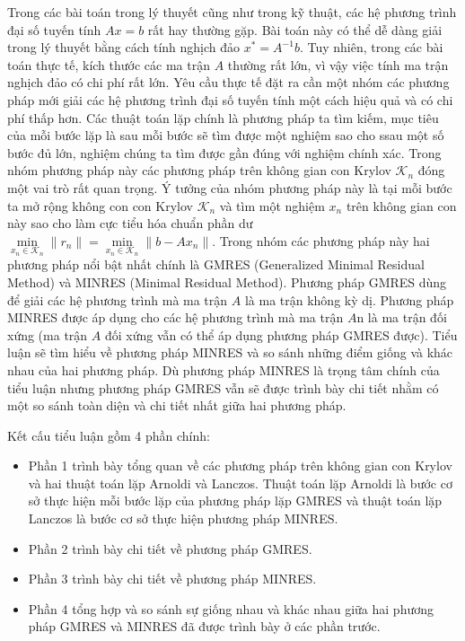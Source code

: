 \documentclass[14pt, a4paper]{article}
\numberwithin{equation}{section}
\numberwithin{algorithm}{section}
\numberwithin{figure}{section}
\numberwithin{dl}{section}
\numberwithin{md}{section}
\numberwithin{bd}{section}
\numberwithin{dn}{section}
\begin{document}
Trong các bài toán trong lý thuyết cũng như trong kỹ thuật, các hệ phương trình đại số tuyến tính $Ax=b$ rất hay thường gặp. Bài toán này có thể dễ dàng giải trong lý thuyết bằng cách tính nghịch đảo $x^* = A^{-1}b$. Tuy nhiên, trong các bài toán thực tế, kích thước các ma trận $A$ thường rất lớn, vì vậy việc tính ma trận nghịch đảo có chi phí rất lớn. Yêu cầu thực tế đặt ra cần một nhóm các phương pháp mới giải các hệ phương trình đại số tuyến tính một cách hiệu quả và có chi phí thấp hơn.
Các thuật toán lặp chính là phương pháp ta tìm kiếm, mục tiêu của mỗi bước lặp là sau mỗi bước sẽ tìm được một nghiệm sao cho ssau một số bước đủ lớn, nghiệm chúng ta tìm được gần đúng với nghiệm chính xác. Trong nhóm phương pháp này các phương pháp trên không gian con Krylov $\mathcal{K}_n$ đóng một vai trò rất quan trọng. Ý tưởng của nhóm phương pháp này là tại mỗi bước ta mở rộng không con con Krylov $\mathcal{K}_n$ và tìm một nghiệm $x_n$ trên không gian con này sao cho làm cực tiểu hóa chuẩn phần dư $\underset{x_n \in \mathcal{K}_n}{\min}\lVert r_n \rVert = \underset{x_n \in \mathcal{K}_n}{\min}\lVert b - A x_n \rVert$. Trong nhóm các phương pháp này hai phương pháp nổi bật nhất chính là GMRES (Generalized Minimal Residual Method) và MINRES (Minimal Residual Method).
Phương pháp GMRES dùng để giải các hệ phương trình mà ma trận $A$ là ma trận không kỳ dị. Phương pháp MINRES được áp dụng cho các hệ phương trình mà ma trận $A$n là ma trận đối xứng (ma trận $A$ đối xứng vẫn có thể áp dụng phương pháp GMRES được). Tiểu luận sẽ tìm hiểu về phương pháp MINRES và so sánh những điểm giống và khác nhau của hai phương pháp. Dù phương pháp MINRES là trọng tâm chính của tiểu luận nhưng phương pháp GMRES vẫn sẽ được trình bày chi tiết nhằm có một so sánh toàn diện và chi tiết nhất giữa hai phương pháp.

Kết cấu tiểu luận gồm 4 phần chính:

\begin{itemize}
    \item Phần 1 trình bày tổng quan về các phương pháp trên không gian con Krylov và hai thuật toán lặp Arnoldi và Lanczos. Thuật toán lặp Arnoldi là bước cơ sở thực hiện mỗi bước lặp của phương pháp lặp GMRES và thuật toán lặp Lanczos là bước cơ sở thực hiện phương pháp MINRES.
    \item Phần 2 trình bày chi tiết về phương pháp GMRES.
    \item Phần 3 trình bày chi tiết về phương pháp MINRES.
    \item Phần 4 tổng hợp và so sánh sự giống nhau và khác nhau giữa hai phương pháp GMRES và MINRES đã được trình bày ở các phần trước.
\end{itemize}
\newpage
\end{document}
